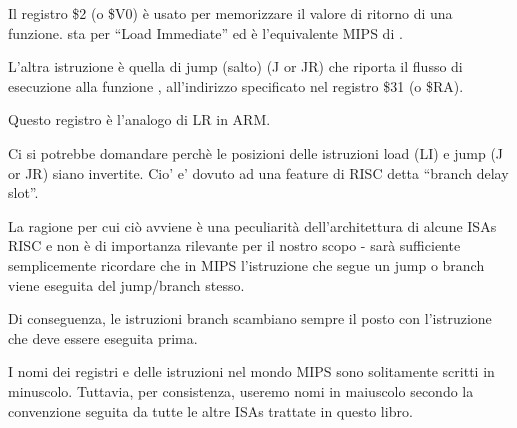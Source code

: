 

\ITAph{}



Il registro \$2 (o \$V0) è usato per memorizzare il valore di ritorno di una funzione.
 sta per ``Load Immediate'' ed è l'equivalente MIPS di \MOV.

L'altra istruzione è quella di jump (salto) (J or JR) che riporta il flusso di esecuzione alla funzione ,  all'indirizzo specificato nel registro \$31 (o \$RA).

Questo registro è l'analogo di \ac{LR} in ARM.

Ci si potrebbe domandare perchè le posizioni delle istruzioni load (LI) e jump (J or JR) siano invertite. Cio' e' dovuto ad una feature di \ac{RISC} detta ``branch delay slot''.

La ragione per cui ciò avviene è una peculiarità dell'architettura di alcune \ac{ISA}s RISC e non è di importanza rilevante per il nostro scopo - sarà sufficiente semplicemente ricordare che in MIPS l'istruzione che segue un jump o branch viene eseguita  del jump/branch stesso.

Di conseguenza, le istruzioni branch scambiano sempre il posto con l'istruzione che deve essere eseguita prima.


I nomi dei registri e delle istruzioni nel mondo MIPS sono solitamente scritti in minuscolo. Tuttavia, per consistenza, useremo nomi in maiuscolo secondo la convenzione seguita da tutte le altre \ac{ISA}s trattate in questo libro.

